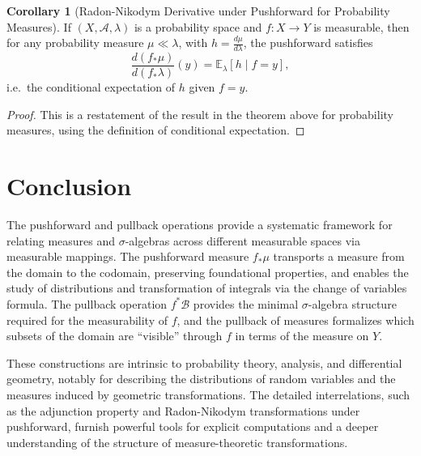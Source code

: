 \documentclass[12pt]{article}
\theoremstyle{definition}
\newtheorem{corollary}[theorem]{Corollary}
\begin{document}
\begin{corollary}[Radon-Nikodym Derivative under Pushforward for Probability Measures]
If $(X, \mathscr{A}, \lambda)$ is a probability space and $f: X \to Y$ is measurable, then for any probability measure $\mu \ll \lambda$, with $h = \frac{d\mu}{d\lambda}$, the pushforward satisfies 
\[
\frac{d(f_{*}\mu)}{d(f_{*}\lambda)}(y) = \mathbb{E}_\lambda [ h \mid f = y ],
\]
i.e.\ the conditional expectation of $h$ given $f = y$.
\end{corollary}

\begin{proof}
This is a restatement of the result in the theorem above for probability measures, using the definition of conditional expectation.
\end{proof}

\section{Conclusion}

The pushforward and pullback operations provide a systematic framework for relating measures and $\sigma$-algebras across different measurable spaces via measurable mappings. The pushforward measure $f_*\mu$ transports a measure from the domain to the codomain, preserving foundational properties, and enables the study of distributions and transformation of integrals via the change of variables formula. The pullback operation $f^*\mathscr{B}$ provides the minimal $\sigma$-algebra structure required for the measurability of $f$, and the pullback of measures formalizes which subsets of the domain are ``visible'' through $f$ in terms of the measure on $Y$.

These constructions are intrinsic to probability theory, analysis, and differential geometry, notably for describing the distributions of random variables and the measures induced by geometric transformations. The detailed interrelations, such as the adjunction property and Radon-Nikodym transformations under pushforward, furnish powerful tools for explicit computations and a deeper understanding of the structure of measure-theoretic transformations.
\end{document}
